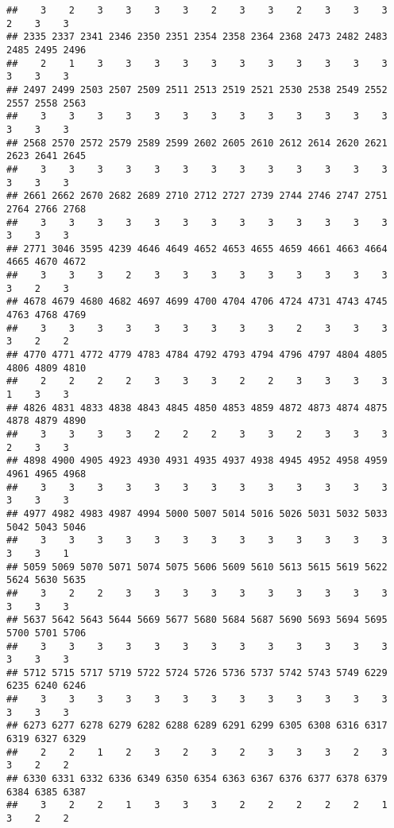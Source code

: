 \documentclass[
]{article}
\begin{document}
\begin{verbatim}
##    3    2    3    3    3    3    2    3    3    2    3    3    3    2    3    3 
## 2335 2337 2341 2346 2350 2351 2354 2358 2364 2368 2473 2482 2483 2485 2495 2496 
##    2    1    3    3    3    3    3    3    3    3    3    3    3    3    3    3 
## 2497 2499 2503 2507 2509 2511 2513 2519 2521 2530 2538 2549 2552 2557 2558 2563 
##    3    3    3    3    3    3    3    3    3    3    3    3    3    3    3    3 
## 2568 2570 2572 2579 2589 2599 2602 2605 2610 2612 2614 2620 2621 2623 2641 2645 
##    3    3    3    3    3    3    3    3    3    3    3    3    3    3    3    3 
## 2661 2662 2670 2682 2689 2710 2712 2727 2739 2744 2746 2747 2751 2764 2766 2768 
##    3    3    3    3    3    3    3    3    3    3    3    3    3    3    3    3 
## 2771 3046 3595 4239 4646 4649 4652 4653 4655 4659 4661 4663 4664 4665 4670 4672 
##    3    3    3    2    3    3    3    3    3    3    3    3    3    3    2    3 
## 4678 4679 4680 4682 4697 4699 4700 4704 4706 4724 4731 4743 4745 4763 4768 4769 
##    3    3    3    3    3    3    3    3    3    2    3    3    3    3    2    2 
## 4770 4771 4772 4779 4783 4784 4792 4793 4794 4796 4797 4804 4805 4806 4809 4810 
##    2    2    2    2    3    3    3    2    2    3    3    3    3    1    3    3 
## 4826 4831 4833 4838 4843 4845 4850 4853 4859 4872 4873 4874 4875 4878 4879 4890 
##    3    3    3    3    2    2    2    3    3    2    3    3    3    2    3    3 
## 4898 4900 4905 4923 4930 4931 4935 4937 4938 4945 4952 4958 4959 4961 4965 4968 
##    3    3    3    3    3    3    3    3    3    3    3    3    3    3    3    3 
## 4977 4982 4983 4987 4994 5000 5007 5014 5016 5026 5031 5032 5033 5042 5043 5046 
##    3    3    3    3    3    3    3    3    3    3    3    3    3    3    3    1 
## 5059 5069 5070 5071 5074 5075 5606 5609 5610 5613 5615 5619 5622 5624 5630 5635 
##    3    2    2    3    3    3    3    3    3    3    3    3    3    3    3    3 
## 5637 5642 5643 5644 5669 5677 5680 5684 5687 5690 5693 5694 5695 5700 5701 5706 
##    3    3    3    3    3    3    3    3    3    3    3    3    3    3    3    3 
## 5712 5715 5717 5719 5722 5724 5726 5736 5737 5742 5743 5749 6229 6235 6240 6246 
##    3    3    3    3    3    3    3    3    3    3    3    3    3    3    3    3 
## 6273 6277 6278 6279 6282 6288 6289 6291 6299 6305 6308 6316 6317 6319 6327 6329 
##    2    2    1    2    3    2    3    2    3    3    3    2    3    3    2    2 
## 6330 6331 6332 6336 6349 6350 6354 6363 6367 6376 6377 6378 6379 6384 6385 6387 
##    3    2    2    1    3    3    3    2    2    2    2    2    1    3    2    2 

\end{verbatim}
\end{document}

